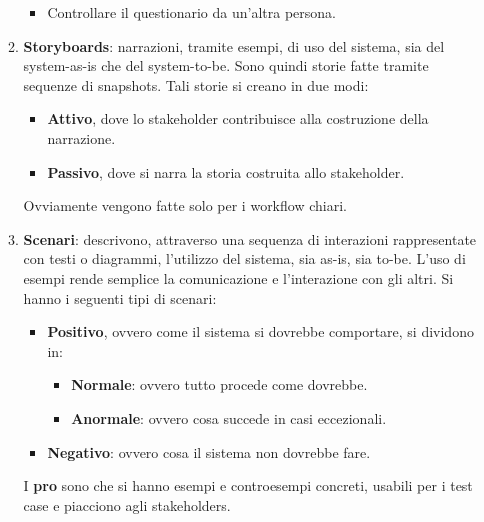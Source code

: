 \begin{itemize}
\begin{enumerate}
\begin{itemize}
                              \item Controllare il questionario da un'altra persona.
                        \end{itemize}
                  \item \textbf{Storyboards}: narrazioni, tramite esempi, di uso
                        del sistema, sia del system-as-is che del system-to-be.
                        Sono quindi storie fatte tramite sequenze di snapshots.
                        Tali storie si creano in due modi:
                        \begin{itemize}
                              \item \textbf{Attivo}, dove lo stakeholder contribuisce
                                    alla costruzione della narrazione.
                              \item \textbf{Passivo}, dove si narra la storia
                                    costruita allo stakeholder.
                        \end{itemize}
                        Ovviamente vengono fatte solo per i workflow chiari.
                  \item \textbf{Scenari}: descrivono, attraverso una sequenza di
                        interazioni rappresentate con testi o diagrammi, l'utilizzo
                        del sistema, sia as-is, sia to-be. L'uso di esempi rende
                        semplice la comunicazione e l'interazione con gli altri.
                        Si hanno i seguenti tipi di scenari:
                        \begin{itemize}
                              \item \textbf{Positivo}, ovvero come il sistema si
                                    dovrebbe comportare, si dividono in:
                                    \begin{itemize}
                                          \item \textbf{Normale}: ovvero tutto
                                                procede come dovrebbe.
                                          \item \textbf{Anormale}: ovvero cosa
                                                succede in casi eccezionali.
                                    \end{itemize}
                              \item \textbf{Negativo}: ovvero cosa il sistema
                                    non dovrebbe fare.
                        \end{itemize}
                        I \textbf{pro} sono che si hanno esempi e controesempi
                        concreti, usabili per i test case e piacciono agli
                        stakeholders.


\end{enumerate}
\end{itemize}
